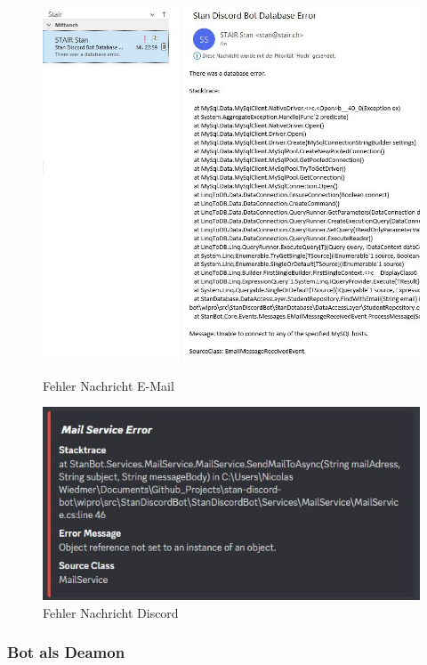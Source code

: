 \documentclass[a4paper, table]{article}
\begin{document}
\begin{figure}[h]
    \begin{minipage}[t]{0.5\textwidth}
        \includegraphics[width=1\textwidth]{img/DatabaseErrorNotificationEmail.png}
        \caption{Fehler Nachricht E-Mail}
    \end{minipage}
    \begin{minipage}[t]{0.5\textwidth}
        \includegraphics[width=1\textwidth]{img/MailErrorNotificationEmbed.png}
        \caption{Fehler Nachricht Discord}
    \end{minipage}
    \label{fig:error-notifications}
\end{figure}

\subsubsection{Bot als Deamon}
\end{document}

